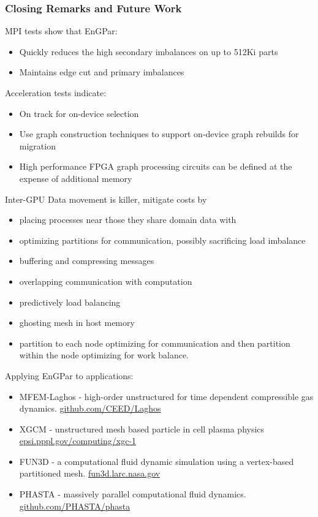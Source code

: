 \documentclass[aspectratio=169]{beamer}
\begin{document}
\begin{frame}
  \frametitle{Closing Remarks and Future Work}
  MPI tests show that EnGPar:
  \begin{itemize}
    \item Quickly reduces the high secondary imbalances on up to 512Ki parts
    \item Maintains edge cut and primary imbalances
  \end{itemize}
  Acceleration tests indicate:
  \begin{itemize}
    \item On track for on-device selection
    \item Use graph construction techniques to support on-device graph rebuilds for migration
    \item High performance FPGA graph processing circuits can be defined at the expense of additional memory
  \end{itemize}
  Inter-GPU Data movement is killer, mitigate costs by
  \begin{itemize}
    \item placing processes near those they share domain data with
    \item optimizing partitions for communication, possibly sacrificing load imbalance
    \item buffering and compressing messages
    \item overlapping communication with computation
    \item predictively load balancing
    \item ghosting mesh in host memory
    \item partition to each node optimizing for communication and then partition
      within the node optimizing for work balance.
  \end{itemize}
  Applying EnGPar to applications:
  \begin{itemize}
    \item MFEM-Laghos - high-order unstructured for time dependent compressible gas dynamics. \url{github.com/CEED/Laghos}
    \item XGCM - unstructured mesh based particle in cell plasma physics \url{epsi.pppl.gov/computing/xgc-1}
    \item FUN3D - a computational fluid dynamic simulation using a vertex-based partitioned mesh. \url{fun3d.larc.nasa.gov}
    \item PHASTA - massively parallel computational fluid dynamics. \url{github.com/PHASTA/phasta}
  \end{itemize}
\end{frame}
\end{document}
